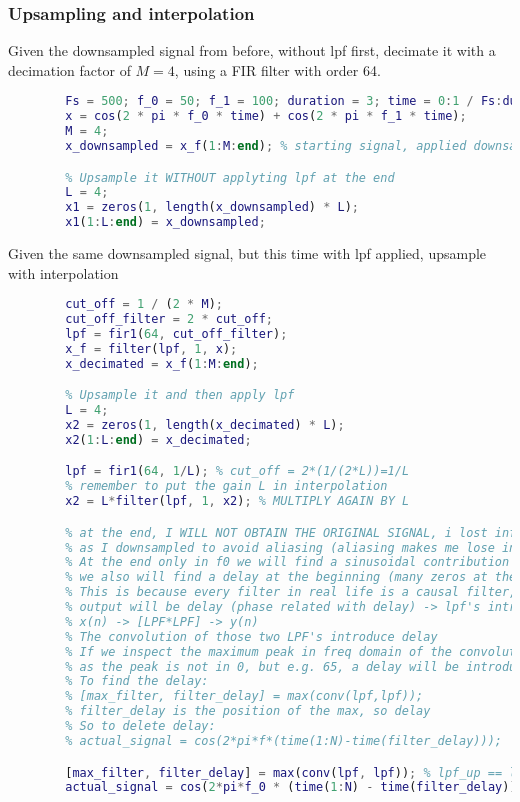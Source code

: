     \subsubsection{Upsampling and interpolation}
    Given the downsampled signal from before, without lpf first, decimate it with a decimation factor of $M=4$, using a FIR filter with order 64.
    \begin{lstlisting}[language=Matlab, escapeinside=`']
        % Starting signal, from before
        Fs = 500; f_0 = 50; f_1 = 100; duration = 3; time = 0:1 / Fs:duration;
        x = cos(2 * pi * f_0 * time) + cos(2 * pi * f_1 * time);
        M = 4;
        x_downsampled = x_f(1:M:end); % starting signal, applied downsample without lpf

        % Upsample it WITHOUT applyting lpf at the end
        L = 4;
        x1 = zeros(1, length(x_downsampled) * L);
        x1(1:L:end) = x_downsampled;
    \end{lstlisting}
    Given the same downsampled signal, but this time with lpf applied, upsample with interpolation
    \begin{lstlisting}[language=Matlab, escapeinside=`']
        % Starting signal, downsampled signal with lpf this time
        cut_off = 1 / (2 * M);
        cut_off_filter = 2 * cut_off;
        lpf = fir1(64, cut_off_filter);
        x_f = filter(lpf, 1, x);
        x_decimated = x_f(1:M:end);

        % Upsample it and then apply lpf
        L = 4;
        x2 = zeros(1, length(x_decimated) * L);
        x2(1:L:end) = x_decimated;

        lpf = fir1(64, 1/L); % cut_off = 2*(1/(2*L))=1/L
        % remember to put the gain L in interpolation
        x2 = L*filter(lpf, 1, x2); % MULTIPLY AGAIN BY L

        % at the end, I WILL NOT OBTAIN THE ORIGINAL SIGNAL, i lost info
        % as I downsampled to avoid aliasing (aliasing makes me lose information)
        % At the end only in f0 we will find a sinusoidal contribution
        % we also will find a delay at the beginning (many zeros at the beginning)
        % This is because every filter in real life is a causal filter, so in the final
        % output will be delay (phase related with delay) -> lpf's introduce delay
        % x(n) -> [LPF*LPF] -> y(n)
        % The convolution of those two LPF's introduce delay
        % If we inspect the maximum peak in freq domain of the convolution/mutiplication
        % as the peak is not in 0, but e.g. 65, a delay will be introduced
        % To find the delay: 
        % [max_filter, filter_delay] = max(conv(lpf,lpf));
        % filter_delay is the position of the max, so delay
        % So to delete delay:
        % actual_signal = cos(2*pi*f*(time(1:N)-time(filter_delay)));

        [max_filter, filter_delay] = max(conv(lpf, lpf)); % lpf_up == lpf_down in this case
        actual_signal = cos(2*pi*f_0 * (time(1:N) - time(filter_delay)));
    \end{lstlisting}

